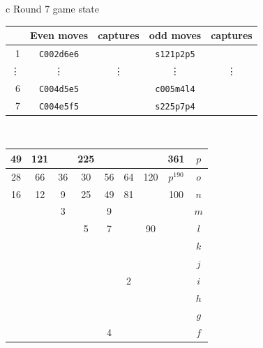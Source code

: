 \documentclass[12pt]{article}
\begin{document}
{\small{
\begin{tabular}{c}
Round 7 game state\\      
\begin{tabular}{r|cc|cc}
 & Even moves & captures   & odd moves & captures \\ \hline 
1   &  {\tt C002d6e6} & \quad &  {\tt s121p2p5} & \quad \\
\vdots &  \vdots    & \vdots  & \vdots    & \vdots \\  
6   &  {\tt C004d5e5} & \quad &   {\tt c005m4l4}  & \quad \\
7   &  {\tt C004e5f5} & \quad &   {\tt s225p7p4} &  \quad \\
\end{tabular}
\\
\begin{tabular}{|c|c|c|c|c|c|c|c||c} \hline
\squadfill{\,}49 & \squadfill{\,}121 & \quad & \squadfill{\,}225 & \quad & \quad & \quad & \squadfill{\,}361 & $p$ \\ \hline
\squadfill{\,}28 & \squadfill{\,}66 & \trianglepafill{\,}36 & \trianglepafill{\,}30 & \trianglepafill{\,}56 & \trianglepafill{\,}64 & \squadfill{\,}120 & \rhombusfill{\,}$p^{190}$ & $o$ \\ \hline
\trianglepafill{\,}16 & \trianglepafill{\,}12 & \circletfill{\,}9 & \circletfill{\,}25 & \circletfill{\,}49 & \circletfill{\,}81 & \quad & \trianglepafill{\,}100 & $n$ \\ \hline
\quad & \quad & \circletfill{\,}3 & \quad & \circletfill{\,}9 & \quad & \quad & \quad & $m$ \\ \hline
\quad & \quad & \quad & \circletfill{\,}5 & \circletfill{\,}7 & \quad & \trianglepafill{\,}90 & \quad & $l$ \\ \hline
\quad & \quad & \quad & \quad & \quad & \quad & \quad & \quad & $k$ \\ \hline
\quad & \quad & \quad & \quad & \quad & \quad & \quad & \quad & $j$ \\ \hline
\quad & \quad & \quad & \quad & \quad & \circlet{\,}2 & \quad & \quad & $i$ \\ \hline
\quad & \quad & \quad & \quad & \quad & \quad & \quad & \quad & $h$ \\ \hline
\quad & \quad & \quad & \quad & \quad & \quad & \quad & \quad & $g$ \\ \hline
\quad & \quad & \quad & \quad & \circlet{\,}4 & \quad & \quad & \quad & $f$ \\ \hline

\end{tabular}
\end{tabular}}}
\end{document}
